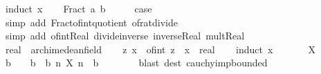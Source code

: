 \begin{isabellebody}
%
\isadelimproof
%
\endisadelimproof
%
\isatagproof
{}\isamarkupfalse%
\ {\isacharparenleft}{\kern0pt}induct\ x{\isacharparenright}{\kern0pt}\isanewline
\ \ \isamarkupfalse%
\ {\isacharparenleft}{\kern0pt}Fract\ a\ b{\isacharparenright}{\kern0pt}\isanewline
\ \ \isamarkupfalse%
\ \isamarkupfalse%
\ {\isacharquery}{\kern0pt}case\ \isanewline
\ \ \isamarkupfalse%
\ {\isacharparenleft}{\kern0pt}simp\ add{\isacharcolon}{\kern0pt}\ Fract{\isacharunderscore}{\kern0pt}of{\isacharunderscore}{\kern0pt}int{\isacharunderscore}{\kern0pt}quotient\ of{\isacharunderscore}{\kern0pt}rat{\isacharunderscore}{\kern0pt}divide{\isacharparenright}{\kern0pt}\isanewline
\ \ \isamarkupfalse%
\ {\isacharparenleft}{\kern0pt}simp\ add{\isacharcolon}{\kern0pt}\ of{\isacharunderscore}{\kern0pt}int{\isacharunderscore}{\kern0pt}Real\ divide{\isacharunderscore}{\kern0pt}inverse\ inverse{\isacharunderscore}{\kern0pt}Real\ mult{\isacharunderscore}{\kern0pt}Real{\isacharparenright}{\kern0pt}\isanewline
\ \ \isamarkupfalse%
\isanewline
{}\isamarkupfalse%
%
\endisatagproof
{\isafoldproof}%
%
\isadelimproof
\isanewline
%
\endisadelimproof
\isanewline
{}\isamarkupfalse%
\ real\ {\isacharcolon}{\kern0pt}{\isacharcolon}{\kern0pt}\ archimedean{\isacharunderscore}{\kern0pt}field\isanewline
%
\isadelimproof
%
\endisadelimproof
%
\isatagproof
{}\isamarkupfalse%
\isanewline
\ \ \isamarkupfalse%
\ {\isachardoublequoteopen}{\isasymexists}z{\isachardot}{\kern0pt}\ x\ {\isasymle}\ of{\isacharunderscore}{\kern0pt}int\ z{\isachardoublequoteclose}\ \ x\ {\isacharcolon}{\kern0pt}{\isacharcolon}{\kern0pt}\ real\isanewline
\ \ \isamarkupfalse%
\ {\isacharparenleft}{\kern0pt}induct\ x{\isacharparenright}{\kern0pt}\isanewline
\ \ \ \ \isamarkupfalse%
\ {\isacharparenleft}{\kern0pt}{}\ X{\isacharparenright}{\kern0pt}\isanewline
\ \ \ \ \isamarkupfalse%
\ \isamarkupfalse%
\ b\ \ {\isachardoublequoteopen}{}\ {\isacharless}{\kern0pt}\ b{\isachardoublequoteclose}\ \ b{\isacharcolon}{\kern0pt}\ {\isachardoublequoteopen}{\isasymAnd}n{\isachardot}{\kern0pt}\ {\isasymbar}X\ n{\isasymbar}\ {\isacharless}{\kern0pt}\ b{\isachardoublequoteclose}\isanewline
\ \ \ \ \ \ \isamarkupfalse%
\ {\isacharparenleft}{\kern0pt}blast\ dest{\isacharcolon}{\kern0pt}\ cauchy{\isacharunderscore}{\kern0pt}imp{\isacharunderscore}{\kern0pt}bounded{\isacharparenright}{\kern0pt}\isanewline

\end{isabellebody}
